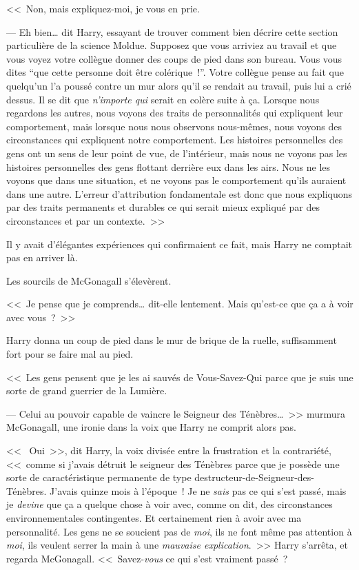 <<~Non, mais expliquez-moi, je vous en prie.

--- Eh bien… dit Harry, essayant de trouver comment bien décrire cette section particulière de la science Moldue. Supposez que vous arriviez au travail et que vous voyez votre collègue donner des coups de pied dans son bureau. Vous vous dites “que cette personne doit être colérique~!”. Votre collègue pense au fait que quelqu'un l'a poussé contre un mur alors qu'il se rendait au travail, puis lui a crié dessus. Il se dit que \emph{n'importe qui} serait en colère suite à ça. Lorsque nous regardons les autres, nous voyons des traits de personnalités qui expliquent leur comportement, mais lorsque nous nous observons nous-mêmes, nous voyons des circonstances qui expliquent notre comportement. Les histoires personnelles des gens ont un sens de leur point de vue, de l'intérieur, mais nous ne voyons pas les histoires personnelles des gens flottant derrière eux dans les airs. Nous ne les voyons que dans une situation, et ne voyons pas le comportement qu'ils auraient dans une autre. L'erreur d'attribution fondamentale est donc que nous expliquons par des traits permanents et durables ce qui serait mieux expliqué par des circonstances et par un contexte.~>>

Il y avait d'élégantes expériences qui confirmaient ce fait, mais Harry ne comptait pas en arriver là.

Les sourcils de McGonagall s'élevèrent.

<<~Je pense que je comprends… dit-elle lentement. Mais qu'est-ce que ça a à voir avec vous~?~>>

Harry donna un coup de pied dans le mur de brique de la ruelle, suffisamment fort pour se faire mal au pied. 

<<~Les gens pensent que je les ai sauvés de Vous-Savez-Qui parce que je suis une sorte de grand guerrier de la Lumière.

--- Celui au pouvoir capable de vaincre le Seigneur des Ténèbres…~>> murmura McGonagall, une ironie dans la voix que Harry ne comprit alors pas.

<<~ Oui~>>, dit Harry, la voix divisée entre la frustration et la contrariété, <<~comme si j'avais détruit le seigneur des Ténèbres parce que je possède une sorte de caractéristique permanente de type destructeur-de-Seigneur-des-Ténèbres. J'avais quinze mois à l'époque~! Je ne \emph{sais} pas ce qui s'est passé, mais je \emph{devine} que ça a quelque chose à voir avec, comme on dit, des circonstances environnementales contingentes. Et certainement rien à avoir avec ma personnalité. Les gens ne se soucient pas de \emph{moi}, ils ne font même pas attention à \emph{moi}, ils veulent serrer la main à une \emph{mauvaise explication}.~>> Harry s'arrêta, et regarda McGonagall. <<~Savez-\emph{vous} ce qui s'est vraiment passé~?

